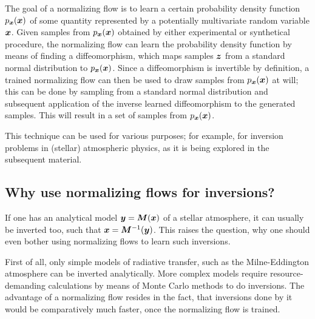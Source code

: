 \documentclass[a4paper,12pt]{report}
\begin{document}
The goal of a normalizing flow is to learn a certain probability density function $p_{\bm{x}}(\bm{x})$ of some quantity represented by a potentially multivariate random variable $\bm{x}$. Given samples from $p_{\bm{x}}(\bm{x})$ obtained by either experimental or synthetical procedure, the normalizing flow can learn the probability density function by means of finding a diffeomorphism, which maps samples $\bm{z}$ from a standard normal distribution to $p_{\bm{x}}(\bm{x})$. Since a diffeomorphism is invertible by definition, a trained normalizing flow can then be used to draw samples from $p_{\bm{x}}(\bm{x})$ at will; this can be done by sampling from a standard normal distribution and subsequent application of the inverse learned diffeomorphism to the generated samples. This will result in a set of samples from $p_{\bm{x}}(\bm{x})$.

This technique can be used for various purposes; for example, for inversion problems in (stellar) atmospheric physics, as it is being explored in the subsequent material.

%

\subsection{Why use normalizing flows for inversions?}
If one has an analytical model $\bm{y} = \bm{M}(\bm{x})$ of a stellar atmosphere, it can usually be inverted too, such that $\bm{x} = \bm{M}^{-1}(\bm{y})$. This raises the question, why one should even bother using normalizing flows to learn such inversions.

First of all, only simple models of radiative transfer, such as the Milne-Eddington atmosphere can be inverted analytically. More complex models require resource-demanding calculations by means of Monte Carlo methods to do inversions. The advantage of a normalizing flow resides in the fact, that inversions done by it would be comparatively much faster, once the normalizing flow is trained.
\end{document}
